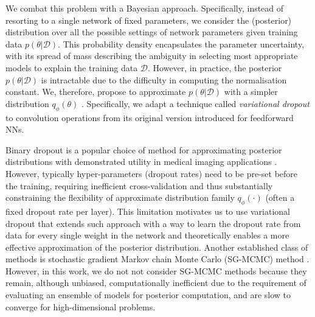We combat this problem with a Bayesian approach. Specifically, instead of resorting to a single network of fixed parameters, we consider the (posterior) distribution over all the possible settings of network parameters given training data $p(\theta|\mathcal{D})$.  This probability density encapsulates the parameter uncertainty, with its spread of mass describing the ambiguity in selecting most appropriate models to explain the training data $\mathcal{D}$. However, in practice, the posterior $p(\theta|\mathcal{D})$ is intractable due to the difficulty in computing the normalisation constant. We, therefore, propose to approximate $p(\theta|\mathcal{D})$ with a simpler distribution $q_{\phi}(\theta)$ \cite {blei2017variational}. Specifically, we adapt a technique called \textit{variational dropout} \cite{kingma2015variational} to convolution operations from its original version introduced for feedforward NNs. 

Binary dropout \cite{srivastava2014dropout} is a popular choice of method for approximating posterior distributions \cite{gal2015dropout} with demonstrated utility in medical imaging applications \cite{worrall2016automated,yang2016fast,leibig2017leveraging,roy2019bayesian,eaton2018towards,nair2018exploring,bragman2018uncertainty}. However, typically hyper-parameters (dropout rates) need to be pre-set before the training, requiring inefficient cross-validation and thus substantially constraining the flexibility of approximate distribution family $q_{\phi}(\cdot)$ (often a fixed dropout rate per layer). This limitation motivates us to use variational dropout \cite{kingma2015variational}  that extends such approach with a way to learn the dropout rate from data for every single weight in the network and theoretically enables a more effective approximation of the posterior distribution. Another established class of methods is stochastic gradient Markov chain Monte Carlo (SG-MCMC) method \cite{neal1993bayesian,welling2011bayesian,chen2014stochastic,ma2015complete}. However, in this work, we do not not consider SG-MCMC methods because they remain, although unbiased, computationally inefficient due to the requirement of evaluating an ensemble of models for posterior computation, and are slow to converge for high-dimensional problems. 

